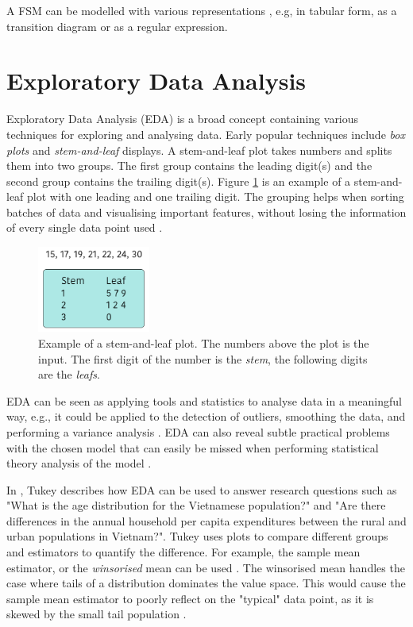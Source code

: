 A FSM can be modelled with various representations \cite{Kozen1997}, e.g, in tabular form, as a transition diagram or as a regular expression.

\section{Exploratory Data Analysis}
Exploratory Data Analysis (EDA) is a broad concept containing various techniques \cite{Anselin1999, Gelman2003, Hoaglin2003, Tukey1977, Velleman1981} for exploring and analysing data.
Early popular techniques include \emph{box plots} and \emph{stem-and-leaf} displays.
A stem-and-leaf plot takes numbers and splits them into two groups.
The first group contains the leading digit(s) and the second group contains the trailing digit(s).
Figure \ref{fig:stem-leaf-plot} is an example of a stem-and-leaf plot with one leading and one trailing digit.
The grouping helps when sorting batches of data and visualising important features, without losing the information of every single data point used \cite{Velleman1981}.

\begin{figure} [h!]
    \centering
    \includegraphics[width=0.33\textwidth]{figures/stem-leaf-plot}
    \caption{Example of a stem-and-leaf plot. The numbers above the plot is the input.
    The first digit of the number is the \emph{stem}, the following digits are the \emph{leafs}.}
    \label{fig:stem-leaf-plot}
\end{figure}

EDA can be seen as applying tools and statistics to analyse data in a meaningful way, e.g., it could be applied to the detection of outliers, smoothing the data, and performing a variance analysis \cite{Anselin1999, Hoaglin2003, Tukey1977, Velleman1981}.
EDA can also reveal subtle practical problems with the chosen model that can easily be missed when performing statistical theory analysis of the model \cite{Gelman2003}.

In \cite{Tukey1977}, Tukey describes how EDA can be used to answer research questions such as "What is the age distribution for the Vietnamese population?" and "Are there differences in
the annual household per capita expenditures between the rural and urban populations in Vietnam?".
Tukey uses plots to compare different groups and estimators to quantify the difference.
For example, the sample mean estimator, or the \emph{winsorised} mean can be used \cite{Tukey1977}.
The winsorised mean handles the case where tails of a distribution dominates the value space.  
This would cause the sample mean estimator to poorly reflect on the "typical" data point, as it is skewed by the small tail population \cite{Tukey1977}.

